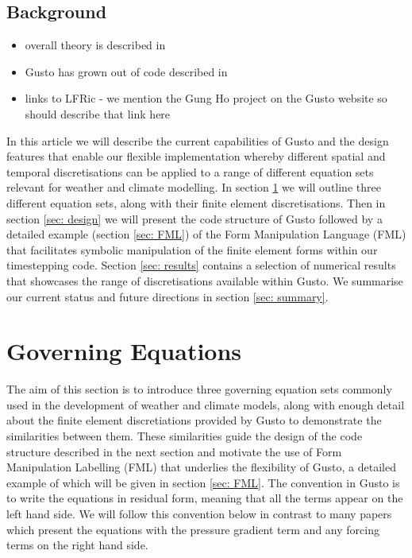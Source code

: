 \documentclass[11pt, a4paper]{article}
\begin{document}
\subsection{Background}

\begin{itemize}
\item overall theory is described in \citet{gibson2019compatible, cotter2023compatible}
\item Gusto has grown out of code described in \citet{natale2016compatible, cotter2012mixed, bendall2019recovered, bendall2020compatible, yamazaki2017vertical, shipton2018higher}
\item links to LFRic - we mention the Gung Ho project on the Gusto website so should describe that link here
\end{itemize}

In this article we will describe the current capabilities of Gusto and
the design features that enable our flexible implementation whereby
different spatial and temporal discretisations can be applied to a
range of different equation sets relevant for weather and climate
modelling. In section \ref{sec: governing} we will outline three
different equation sets, along with their finite element
discretisations. Then in section \ref{sec: design} we will present the
code structure of Gusto followed by a detailed example (section
\ref{sec: FML}) of the Form Manipulation Language (FML) that facilitates
symbolic manipulation of the finite element forms within our
timestepping code. Section \ref{sec: results} contains a selection of
numerical results that showcases the range of discretisations
available within Gusto. We summarise our current status and future
directions in section \ref{sec: summary}.

\section{Governing Equations}
\label{sec: governing}
The aim of this section is to introduce three governing equation sets
commonly used in the development of weather and climate models, along
with enough detail about the finite element discretiations provided by
Gusto to demonstrate the similarities between them. These similarities
guide the design of the code structure described in the next section
and motivate the use of Form Manipulation Labelling (FML) that
underlies the flexibility of Gusto, a detailed example of which will
be given in section \ref{sec: FML}. The convention in Gusto is to
write the equations in residual form, meaning that all the terms
appear on the left hand side. We will follow this convention below in
contrast to many papers which present the equations with the pressure
gradient term and any forcing terms on the right hand side.
\end{document}
